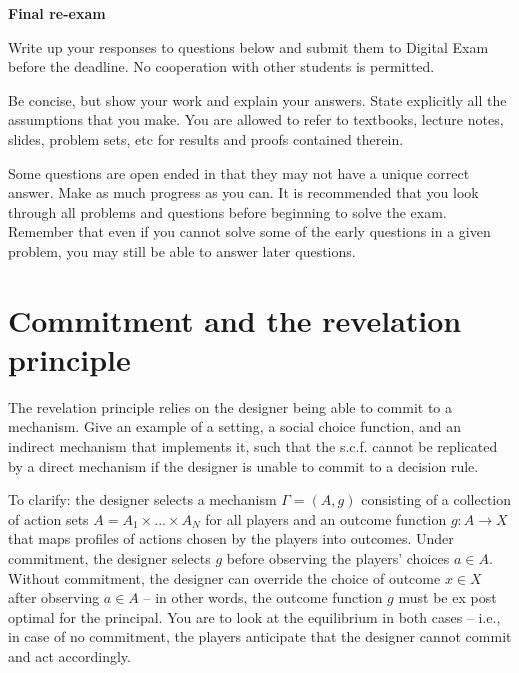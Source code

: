 \documentclass[a4paper]{article}
\newif\ifsolutions
\begin{document}
{\ifsolutions \else	
	
\fi}

\begin{center}
		\LARGE\textbf{Final re-exam {\ifsolutions solutions \fi}}
\end{center}

{\ifsolutions \else	
Write up your responses to questions below and submit them to Digital Exam before the deadline. No cooperation with other students is permitted.

Be concise, but show your work and explain your answers. State explicitly all the assumptions that you make. You are allowed to refer to textbooks, lecture notes, slides, problem sets, etc for results and proofs contained therein.

Some questions are open ended in that they may not have a unique correct answer. Make as much progress as you can. It is recommended that you look through all problems and questions before beginning to solve the exam. Remember that even if you cannot solve some of the early questions in a given problem, you may still be able to answer later questions. 
\fi}




\section{Commitment and the revelation principle}
The revelation principle relies on the designer being able to commit to a mechanism. Give an example of a setting, a social choice function, and an indirect mechanism that implements it, such that the s.c.f. cannot be replicated by a direct mechanism if the designer is unable to commit to a decision rule.

To clarify: the designer selects a mechanism $\Gamma = (A,g)$ consisting of a collection of action sets $A= A_1 \times ... \times A_N$ for all players and an outcome function $g: A \to X$ that maps profiles of actions chosen by the players into outcomes. Under commitment, the designer selects $g$ before observing the players' choices $a \in A$. Without commitment, the designer can override the choice of outcome $x \in X$ after observing $a \in A$ -- in other words, the outcome function $g$ must be ex post optimal for the principal. You are to look at the equilibrium in both cases -- i.e., in case of no commitment, the players anticipate that the designer cannot commit and act accordingly.


\ifsolutions
\end{document}
